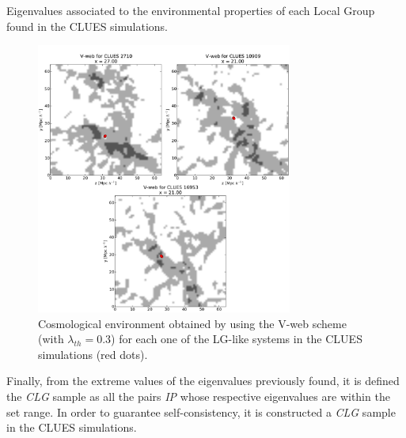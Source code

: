 \begin{itemize}
\begin{table}[htbp]
\begin{flushright}
\begin{minipage}[r]{0.9\textwidth}
\begin{small}
  \caption{Eigenvalues associated to the environmental properties of each
  Local Group found in the CLUES simulations.}  
  \label{tab:Lambdas_LG}
\end{small}
\end{minipage}
\end{flushright}
\end{table}


\begin{figure}[htbp]
\begin{flushright}
\begin{minipage}[r]{0.9\textwidth}
	\centering
	\includegraphics[width=0.75\textwidth]
	{./figures/3_nbody_simulations/LG_Environment.png}

	\caption{\small{Cosmological environment obtained by using the V-web
	scheme (with $\lambda_{th} = 0.3$) for each one of the LG-like systems
	in the CLUES simulations (red dots).}}
	\label{fig:LG_Sample_Environment}
\end{minipage}
\end{flushright}
\end{figure}


Finally, from the extreme values of the eigenvalues previously found, it
is defined the \textit{CLG} sample as all the pairs \textit{IP} whose 
respective eigenvalues are within the set range. In order to guarantee
self-consistency, it is constructed a \textit{CLG} sample in the CLUES
simulations.



\end{itemize}


